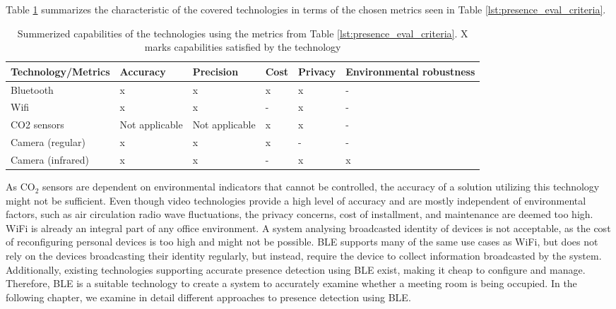 Table \ref{lst:evaluated_technologies} summarizes the characteristic of the covered technologies in terms of the chosen metrics seen in Table \ref{lst:presence_eval_criteria}.
\begin{table}[H]
    \centering
    \begin{center}
        \begin{tabular}{|l|p{20mm}|p{20mm}|l|l|p{25mm}|}
            \hline
            Technology/Metrics & Accuracy & Precision & Cost & Privacy & Environmental robustness \\ \hline
            Bluetooth          & x        & x         & x    & x       & -                      \\ \hline
            Wifi               & x        & x         & -    & x       & -                      \\ \hline
            CO2 sensors        & Not applicable        & Not applicable         & x    & x       & -                      \\ \hline
            Camera (regular)   & x        & x         & x    & -       & -                      \\ \hline
            Camera (infrared)  & x        & x         & -    & x       & x                      \\ \hline
        \end{tabular}
    \end{center}
    \caption{Summerized capabilities of the technologies using the metrics from Table \ref{lst:presence_eval_criteria}. X marks capabilities satisfied by the technology}
    \label{lst:evaluated_technologies}
\end{table}






As $\text{CO}_{2}$ sensors are dependent on environmental indicators that cannot be controlled, the accuracy of a solution utilizing this technology might not be sufficient.
Even though video technologies provide a high level of accuracy and are mostly independent of environmental factors, such as air circulation radio wave fluctuations, the privacy concerns, cost of installment, and maintenance are deemed too high.
WiFi is already an integral part of any office environment. 
A system analysing broadcasted identity of devices is not acceptable, as the cost of reconfiguring personal devices is too high and might not be possible.  
BLE supports many of the same use cases as WiFi, but does not rely on the devices broadcasting their identity regularly, but instead, require the device to collect information broadcasted by the system.
Additionally, existing technologies supporting accurate presence detection using BLE exist, making it cheap to configure and manage. 
Therefore, BLE is a suitable technology to create a system to accurately examine whether a meeting room is being occupied.
In the following chapter, we examine in detail different approaches to presence detection using BLE.